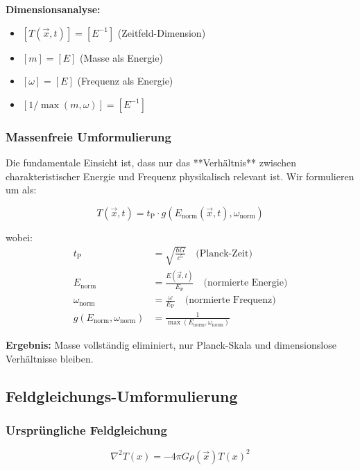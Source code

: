 \documentclass[12pt,a4paper]{article}
\newcommand{\Tfield}{T(x)}
\newcommand{\Tfieldt}{T(\vec{x},t)}
\newcommand{\vecx}{\vec{x}}
\newcommand{\tP}{t_{\text{P}}}
\newcommand{\EP}{E_{\text{P}}}
\begin{document}
	\textbf{Dimensionsanalyse:}
	\begin{itemize}
		\item $[\Tfieldt] = [E^{-1}]$ (Zeitfeld-Dimension)
		\item $[m] = [E]$ (Masse als Energie)
		\item $[\omega] = [E]$ (Frequenz als Energie)
		\item $[1/\max(m,\omega)] = [E^{-1}]$ \checkmark
	\end{itemize}
	
	\subsubsection{Massenfreie Umformulierung}
	
	Die fundamentale Einsicht ist, dass nur das **Verhältnis** zwischen charakteristischer Energie und Frequenz physikalisch relevant ist. Wir formulieren um als:
	
	\begin{equation}
		\boxed{\Tfieldt = \tP \cdot g(E_{\text{norm}}(\vecx,t), \omega_{\text{norm}})}
		\label{eq:time_field_mass_free}
	\end{equation}
	
	wobei:
	\begin{align}
		\tP &= \sqrt{\frac{\hbar G}{c^5}} \quad \text{(Planck-Zeit)} \\
		E_{\text{norm}} &= \frac{E(\vecx,t)}{\EP} \quad \text{(normierte Energie)} \\
		\omega_{\text{norm}} &= \frac{\omega}{\EP} \quad \text{(normierte Frequenz)} \\
		g(E_{\text{norm}}, \omega_{\text{norm}}) &= \frac{1}{\max(E_{\text{norm}}, \omega_{\text{norm}})}
	\end{align}
	
	\textbf{Ergebnis:} Masse vollständig eliminiert, nur Planck-Skala und dimensionslose Verhältnisse bleiben.
	
	\subsection{Feldgleichungs-Umformulierung}
	\label{subsec:field_equation_elimination}
	
	\subsubsection{Ursprüngliche Feldgleichung}
	
	\begin{equation}
		\nabla^2 \Tfield = -4\pi G \rho(\vecx) \Tfield^2
		\label{eq:field_equation_original}
	\end{equation}
	
\end{document}
